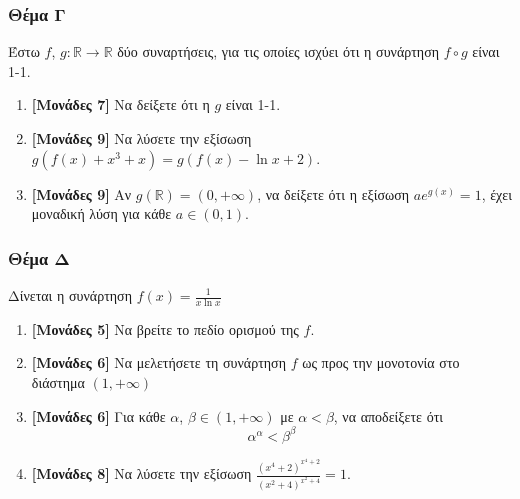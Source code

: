 \documentclass[12pt]{article}
\begin{document}
\section*{Θέμα Γ}
  \noindent
  Έστω $f$, $g:\mathbb{R}\to \mathbb{R}$ δύο συναρτήσεις, για τις οποίες ισχύει ότι η συνάρτηση $f\circ g$ είναι 1-1.
  \begin{enumerate}
    \item \textbf{[Μονάδες 7]} Να δείξετε ότι η $g$ είναι 1-1.
    \item \textbf{[Μονάδες 9]} Να λύσετε την εξίσωση $g\left( f(x)+x^3+x\right)=g\left( f(x)-\ln x+ 2\right)$.
    \item \textbf{[Μονάδες 9]} Αν $g(\mathbb{R})=(0,+\infty)$, να δείξετε ότι η εξίσωση $ae^{g(x)}=1$, έχει μοναδική λύση για κάθε $a\in (0,1)$.
  \end{enumerate}

  \section*{Θέμα Δ}
    \noindent
    Δίνεται η συνάρτηση $f(x)=\frac{1}{x\ln x}$
    \begin{enumerate}
      \item \textbf{[Μονάδες 5]} Να βρείτε το πεδίο ορισμού της $f$.
      \item \textbf{[Μονάδες 6]} Να μελετήσετε τη συνάρτηση $f$ ως προς την μονοτονία στο διάστημα $(1,+\infty)$
      \item \textbf{[Μονάδες 6]} Για κάθε $α$, $β\in (1,+\infty)$ με $α<β$, να αποδείξετε ότι
$$α^α<β^β$$
      \item \textbf{[Μονάδες 8]} Να λύσετε την εξίσωση $\frac{(x^4+2)^{x^4+2}}{(x^2+4)^{x^2+4}}=1$.
    \end{enumerate}

\vspace{2\baselineskip}

\part*{}
\end{document}
